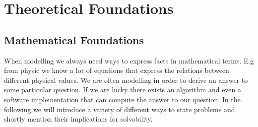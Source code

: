 \chapter{Theoretical Foundations}
\section{Mathematical Foundations}
When modelling we always need ways to express facts in mathematical terms. E.g from physic we know a lot of equations that express the relations between different physical values. We are often modelling in order to derive an answer to some particular question. If we are lucky there exists an algorithm and even a software implementation that can compute the answer to our question. In the following we will introduce a variety of different ways to state problems and shortly mention their implications for solvability.
